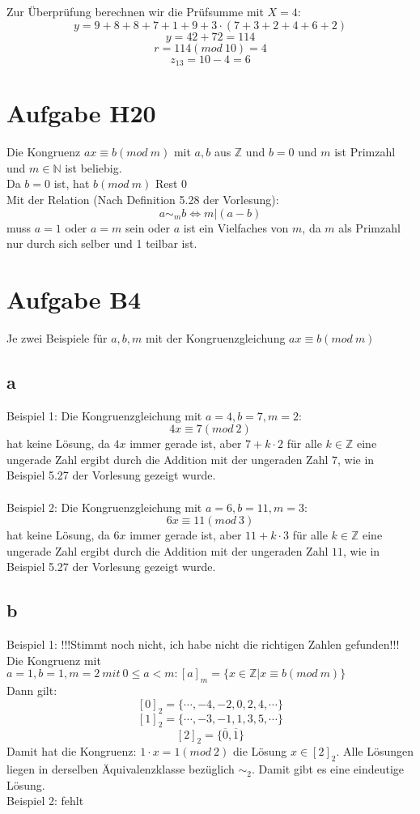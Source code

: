 \documentclass[11pt,a4paper]{article}
\begin{document}
Zur Überprüfung berechnen wir die Prüfsumme mit $X=4$:\\
\[y = 9+8+8+7+1+9 + 3 \cdot (7+3+2+4+6+2)\]
\[y = 42 + 72 = 114\]
\[r = 114(mod~10) = 4\]
\[z_{13} = 10-4 = 6\]

\section*{Aufgabe H20}
Die Kongruenz $ax \equiv b(mod~m)$ mit $a,b$ aus $ \mathbb{Z}$ und $b=0$ und $m$ ist Primzahl und $m \in \mathbb{N}$ ist beliebig.\\
Da $b=0$ ist, hat $b(mod~m)$ Rest $0$\\
Mit der Relation (Nach Definition 5.28 der Vorlesung):\\
\[a \sim_m b \Longleftrightarrow m|(a-b)\]
muss $a=1$ oder $a=m$ sein oder $a$ ist ein Vielfaches von $m$, da $m$ als Primzahl nur durch sich selber und 1 teilbar ist.\\
\section*{Aufgabe B4}
Je zwei Beispiele für $a,b,m$ mit der Kongruenzgleichung $ax \equiv b(mod~m)$
\subsection*{a}
Beispiel 1: Die Kongruenzgleichung mit $a=4, b=7, m=2$:\\
\[4x \equiv 7 (mod~2)\]
hat keine Lösung, da $4x$ immer gerade ist, aber $7 + k \cdot 2$ für alle $k \in \mathbb{Z}$ eine ungerade Zahl ergibt durch die Addition mit der ungeraden Zahl $7$, wie in Beispiel 5.27 der Vorlesung gezeigt wurde.\\
\\
Beispiel 2: Die Kongruenzgleichung mit $a=6, b=11, m=3$:\\
\[6x \equiv 11 (mod~3)\]
hat keine Lösung, da $6x$ immer gerade ist, aber $11 + k \cdot 3$ für alle $k \in \mathbb{Z}$ eine ungerade Zahl ergibt durch die Addition mit der ungeraden Zahl $11$, wie in Beispiel 5.27 der Vorlesung gezeigt wurde.\\
\subsection*{b}
Beispiel 1: !!!Stimmt noch nicht, ich habe nicht die richtigen Zahlen gefunden!!!\\
Die Kongruenz mit $a=1, b=1, m=2 ~mit~ 0\leq a < m: [a]_m = \{x \in \mathbb{Z}| x\equiv b(mod~m)\}$\\
Dann gilt:\\
\[[0]_2 = \{\cdots, -4,-2,0,2,4,\cdots \}\]
\[[1]_2 = \{\cdots, -3,-1,1,3,5,\cdots \}\]
\[[2]_2 = \{\overline{0}, \overline{1}\}\]
Damit hat die Kongruenz: $1\cdot x=1(mod~2)$ die Lösung $x \in [2]_2.$ Alle Lösungen liegen in derselben Äquivalenzklasse bezüglich $\sim_2$. Damit gibt es eine eindeutige Lösung.\\
Beispiel 2: fehlt
\end{document}
